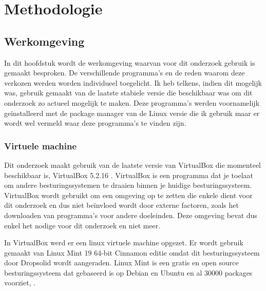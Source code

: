 
\chapter{Methodologie}
\label{ch:methodologie}
\section{Werkomgeving}
In dit hoofdstuk wordt de werkomgeving waarvan voor dit onderzoek gebruik is gemaakt besproken. De verschillende programma's en de reden waarom deze verkozen werden worden individueel toegelicht. Ik heb telkens, indien dit mogelijk was, gebruik gemaakt van de laatste stabiele versie die beschikbaar was om dit onderzoek zo actueel mogelijk te maken. Deze programma's werden voornamelijk geïnstalleerd met de package manager van de Linux versie die ik gebruik maar er wordt wel vermeld waar deze programma's te vinden zijn.

\subsection{Virtuele machine}
Dit onderzoek maakt gebruik van de laatste versie van VirtualBox die momenteel beschikbaar is, VirtualBox 5.2.16 \textcite{VirtualBox}. VirtualBox is een programma dat je toelaat om andere besturingssystemen te draaien binnen je huidige besturingssysteem. VirtualBox wordt gebruikt om een omgeving op te zetten die enkele dient voor dit onderzoek en dus niet beïnvloed wordt door externe factoren, zoals het downloaden van programma's voor andere doeleinden. Deze omgeving bevat dus enkel het nodige voor dit onderzoek en niet meer. 

In VirtualBox werd er een linux virtuele machine opgezet. Er wordt gebruik gemaakt van Linux Mint 19 64-bit Cinnamon editie omdat dit besturingssysteem door Dropsolid wordt aangeraden. Linux Mint is een gratis en open source besturingssysteem dat gebaseerd is op Debian en Ubuntu en al 30000 packages voorziet, \textcite{LinuxMint}.

